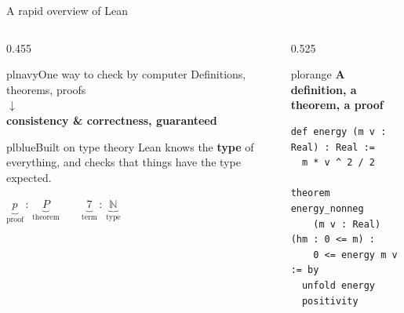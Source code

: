 \documentclass[aspectratio=169,10pt]{beamer}
\begin{document}
\begin{frame}[fragile]{A rapid overview of Lean}
  \vfill
  \begin{columns}[c,onlytextwidth]

    \begin{column}{0.455\textwidth}
      \begin{plcard}[halign=center,top=5pt,bottom=5pt]%
                    {plnavy}{\hfill One way to check by computer\hfill}
        \small Definitions, theorems, proofs\\[2pt]
        {\color{plorange}$\downarrow$}\\[2pt]
        \textbf{consistency \& correctness, guaranteed}
      \end{plcard}

      \begin{plcard}[top=5pt,bottom=5pt,before skip=2pt]{plblue}{Built on type theory}
        \small
        Lean knows the \textbf{type} of everything, and checks
        that things have the type expected.\par
        \vspace{4pt}
        {\centering\small
          $\underbrace{p}_{\text{proof}}\,:\,\underbrace{P}_{\text{theorem}}
           \qquad
           \underbrace{7}_{\text{term}}\,:\,\underbrace{\mathbb{N}}_{\text{type}}$\par}
      \end{plcard}
    \end{column}

    \begin{column}{0.525\textwidth}
      \begin{plplain}{plorange}
        {\footnotesize\bfseries\color{plorange}A definition, a theorem, a proof}
        \vspace{5pt}
\begin{lstlisting}
def energy (m v : Real) : Real :=
  m * v ^ 2 / 2

theorem energy_nonneg
    (m v : Real) (hm : 0 <= m) :
    0 <= energy m v := by
  unfold energy
  positivity
\end{lstlisting}
      \end{plplain}
    \end{column}

  \end{columns}
  \vfill
\end{frame}
\end{document}
